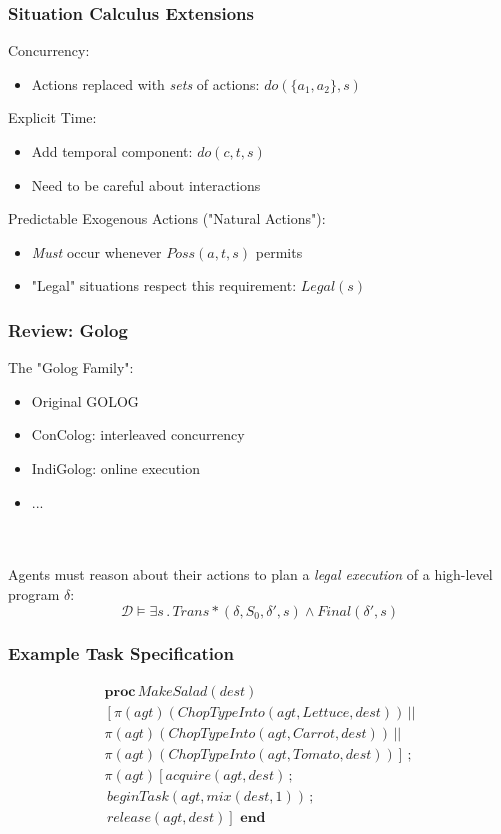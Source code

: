 \documentclass[compress]{beamer}
\begin{document}
\begin{frame}
\frametitle{Situation Calculus Extensions}
Concurrency:
\begin{itemize}
  \item Actions replaced with \emph{sets} of actions: $do(\{a_1,a_2\},s)$
\end{itemize}
\pause
Explicit Time:
\begin{itemize}
  \item Add temporal component: $do(c,t,s)$
  \item Need to be careful about interactions
\end{itemize}
\pause
Predictable Exogenous Actions ("Natural Actions"):
\begin{itemize}
  \item \emph{Must} occur whenever $Poss(a,t,s)$ permits
  \item "Legal" situations respect this requirement: $Legal(s)$
\end{itemize}
\end{frame}

\begin{frame}
\frametitle{Review: Golog}
The "Golog Family":
\begin{itemize}
  \item Original GOLOG
  \item ConColog: interleaved concurrency
  \item IndiGolog: online execution
  \item ...
\end{itemize}
\ \\
\ \\
Agents must reason about their actions to plan a \emph{legal execution} of
a high-level program $\delta$:
\begin{equation*}
\mathcal{D}\models\exists s\,.\,Trans*(\delta,S_0,\delta',s)\wedge Final(\delta',s)
\end{equation*}
\end{frame}

\begin{frame}
\frametitle{Example Task Specification}
\begin{multline*}
\mathbf{proc}\, MakeSalad(dest)\\
\left[\pi(agt)(ChopTypeInto(agt,Lettuce,dest))\,||\right.\\
\pi(agt)(ChopTypeInto(agt,Carrot,dest))\,||\\
\left.\pi(agt)(ChopTypeInto(agt,Tomato,dest))\right]\,;\\
\pi(agt)\left[acquire(agt,dest)\,;\right.\\
\,beginTask(agt,mix(dest,1))\,;\\
\left.\, release(agt,dest)\right]\,\,\mathbf{end}
\end{multline*}
\end{frame}
\end{document}
